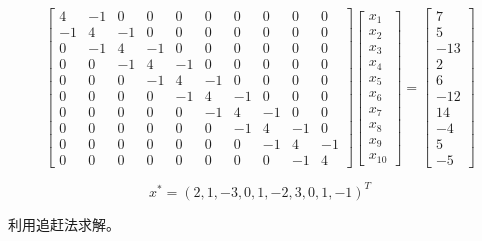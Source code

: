 \[
    \begin{bmatrix}
        4  & -1 & 0  & 0  & 0  & 0  & 0  & 0  & 0  & 0  \\
        -1 & 4  & -1 & 0  & 0  & 0  & 0  & 0  & 0  & 0  \\
        0  & -1 & 4  & -1 & 0  & 0  & 0  & 0  & 0  & 0  \\
        0  & 0  & -1 & 4  & -1 & 0  & 0  & 0  & 0  & 0  \\
        0  & 0  & 0  & -1 & 4  & -1 & 0  & 0  & 0  & 0  \\
        0  & 0  & 0  & 0  & -1 & 4  & -1 & 0  & 0  & 0  \\
        0  & 0  & 0  & 0  & 0  & -1 & 4  & -1 & 0  & 0  \\
        0  & 0  & 0  & 0  & 0  & 0  & -1 & 4  & -1 & 0  \\
        0  & 0  & 0  & 0  & 0  & 0  & 0  & -1 & 4  & -1 \\
        0  & 0  & 0  & 0  & 0  & 0  & 0  & 0  & -1 & 4
    \end{bmatrix}
    \begin{bmatrix}
        x_1 \\
        x_2 \\
        x_3 \\
        x_4 \\
        x_5 \\
        x_6 \\
        x_7 \\
        x_8 \\
        x_9 \\
        x_{10}
    \end{bmatrix}
    =
    \begin{bmatrix}
        7   \\
        5   \\
        -13 \\
        2   \\
        6   \\
        -12 \\
        14  \\
        -4  \\
        5   \\
        -5
    \end{bmatrix}
\]

\[ x^* = (2, 1, -3, 0, 1, -2, 3, 0, 1, -1)^T \]

利用追赶法求解。
